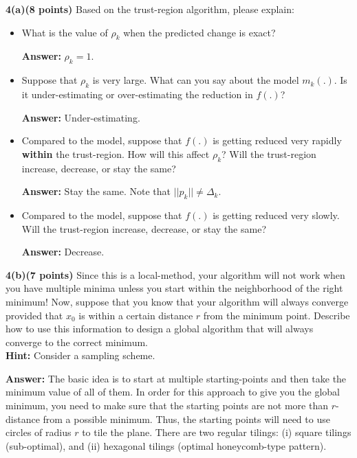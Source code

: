 \documentclass[12pt,legalpaper]{article}
\begin{document}
{\bf 4(a)(8 points)} Based on the trust-region algorithm, please explain:
\begin{itemize}
        \item What is the value of $\rho_k$ when the predicted change is exact?
        
        {\bf Answer:} $\rho_k=1$.
        \item Suppose that $\rho_k$ is very large. What can you say about the model $m_k(.)$.
                 Is it under-estimating or over-estimating the reduction in $f(.)$?
                 
        {\bf Answer: } Under-estimating.
        \item Compared to the model, suppose that $f(.)$ is getting reduced very rapidly {\bf within} the trust-region. 
                 How will this affect $\rho_k$? Will the trust-region increase, decrease, or stay the same?
                 
        {\bf Answer:} Stay the same. Note that $||p_k|| \neq \Delta_k$.        
        \item Compared to the model, suppose that $f(.)$ is getting reduced very slowly.
                 Will the trust-region increase, decrease, or stay the same? 
                 
       {\bf Answer:} Decrease.           
 \end{itemize}
\newpage

{\bf 4(b)(7 points)} Since this is a local-method, your algorithm will not work when you have multiple minima
  unless you start within the neighborhood of the right minimum!
  Now, suppose that you know that your algorithm will always converge provided that $x_0$ is within
    a certain distance $r$ from the minimum point.
  Describe how to use this information to design a global algorithm that will always converge to
    the correct minimum. \\
  {\bf Hint:} Consider a sampling scheme.
 
{\bf Answer:} The basic idea is to start at multiple starting-points and then take the minimum value of all of them.
In order for this approach to give you the global minimum, you need to make sure that the starting points are not
more than $r$-distance from a possible minimum. Thus, the starting points will need to use circles of radius $r$ 
to tile the plane. There are two regular tilings: (i) square tilings (sub-optimal), and (ii) hexagonal tilings (optimal honeycomb-type pattern). 
\end{document}
